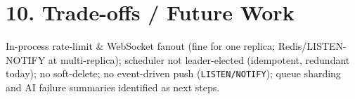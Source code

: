 \documentclass[11pt]{article}
\begin{document}
\section*{10. Trade-offs / Future Work}
In-process rate-limit \& WebSocket fanout (fine for one replica; Redis/LISTEN-NOTIFY at multi-replica);
scheduler not leader-elected (idempotent, redundant today); no soft-delete; no event-driven push
(\texttt{LISTEN/NOTIFY}); queue sharding and AI failure summaries identified as next steps.
\end{document}
